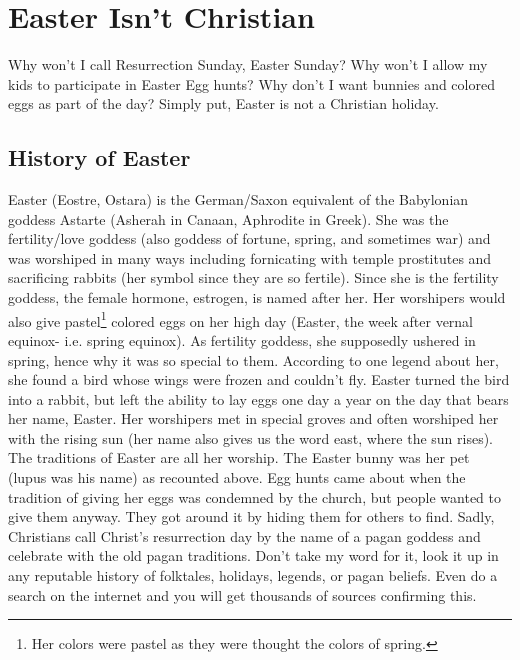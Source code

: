 \chapter{Easter Isn't Christian}

Why won't I call Resurrection Sunday, Easter Sunday?  Why won't I allow my kids to participate in Easter Egg hunts?  Why don't I want bunnies and colored eggs as part of the day?  Simply put, Easter is not a Christian holiday.

\section{History of Easter}
Easter (Eostre, Ostara) is the German/Saxon equivalent of the Babylonian goddess Astarte (Asherah in Canaan, Aphrodite in Greek).  She was the fertility/love goddess (also goddess of fortune, spring, and sometimes war) and was worshiped in many ways including fornicating with temple prostitutes and sacrificing rabbits (her symbol since they are so fertile).  Since she is the fertility goddess, the female hormone, estrogen, is named after her.  Her worshipers would also give pastel\footnote{Her colors were pastel as they were thought the colors of spring.} colored eggs on her high day (Easter, the week after vernal equinox- i.e. spring equinox).  As fertility goddess, she supposedly ushered in spring, hence why it was so special to them.  According to one legend about her, she found a bird whose wings were frozen and couldn't fly.  Easter turned the bird into a rabbit, but left the ability to lay eggs one day a year on the day that bears her name, Easter.  Her worshipers met in special groves and often worshiped her with the rising sun (her name also gives us the word east, where the sun rises).  The traditions of Easter are all her worship.  The Easter bunny was her pet (lupus was his name) as recounted above.  Egg hunts came about when the tradition of giving her eggs was condemned by the church, but people wanted to give them anyway.  They got around it by hiding them for others to find.  Sadly, Christians call Christ's resurrection day by the name of a pagan goddess and celebrate with the old pagan traditions.  Don't take my word for it, look it up in any reputable history of folktales, holidays, legends, or pagan beliefs.  Even do a search on the internet and you will get thousands of sources confirming this.


